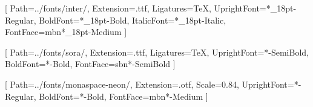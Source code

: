 
\setmainfont{Inter}[
    Path=../fonts/inter/,
    Extension=.ttf,
    Ligatures=TeX,
    UprightFont=*_18pt-Regular,
    BoldFont=*_18pt-Bold,
    ItalicFont=*_18pt-Italic,
    FontFace={mb}{n}{*_18pt-Medium}
]

[
    Path=../fonts/sora/,
    Extension=.ttf,
    Ligatures=TeX,
    UprightFont=*-SemiBold,
    BoldFont=*-Bold,
    FontFace={sb}{n}{*-SemiBold}
]

\setmonofont{MonaspaceNeon}[
    Path=../fonts/monaspace-neon/,
    Extension=.otf,
    Scale=0.84,
    UprightFont=*-Regular,
    BoldFont=*-Bold,
    FontFace={mb}{n}{*-Medium}
]
